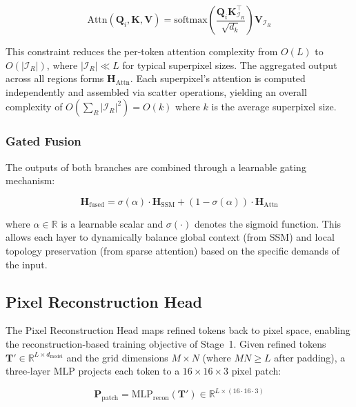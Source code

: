 \documentclass[lettersize,journal]{IEEEtran}
\begin{document}
\begin{equation}
\label{eq:topoattn}
\text{Attn}(\mathbf{Q}_i, \mathbf{K}, \mathbf{V}) = \text{softmax}\left(\frac{\mathbf{Q}_i \mathbf{K}_{\mathcal{I}_R}^\top}{\sqrt{d_k}}\right) \mathbf{V}_{\mathcal{I}_R}
\end{equation}

This constraint reduces the per-token attention complexity from $O(L)$ to $O(|\mathcal{I}_R|)$, where $|\mathcal{I}_R| \ll L$ for typical superpixel sizes. The aggregated output across all regions forms $\mathbf{H}_{\text{Attn}}$. Each superpixel's attention is computed independently and assembled via scatter operations, yielding an overall complexity of $O(\sum_R |\mathcal{I}_R|^2) = O(k)$ where $k$ is the average superpixel size.

\subsubsection{Gated Fusion}

The outputs of both branches are combined through a learnable gating mechanism:

\begin{equation}
\label{eq:gate}
\mathbf{H}_{\text{fused}} = \sigma(\alpha) \cdot \mathbf{H}_{\text{SSM}} + (1 - \sigma(\alpha)) \cdot \mathbf{H}_{\text{Attn}}
\end{equation}

where $\alpha \in \mathbb{R}$ is a learnable scalar and $\sigma(\cdot)$ denotes the sigmoid function. This allows each layer to dynamically balance global context (from SSM) and local topology preservation (from sparse attention) based on the specific demands of the input.

\subsection{Pixel Reconstruction Head}
\label{sec:pixelhead}

The Pixel Reconstruction Head maps refined tokens back to pixel space, enabling the reconstruction-based training objective of Stage~1. Given refined tokens $\mathbf{T}' \in \mathbb{R}^{L \times d_{\text{model}}}$ and the grid dimensions $M \times N$ (where $M N \geq L$ after padding), a three-layer MLP projects each token to a $16 \times 16 \times 3$ pixel patch:

\begin{equation}
\label{eq:pixelhead}
\mathbf{P}_{\text{patch}} = \text{MLP}_{\text{recon}}(\mathbf{T}') \in \mathbb{R}^{L \times (16 \cdot 16 \cdot 3)}
\end{equation}
\end{document}
